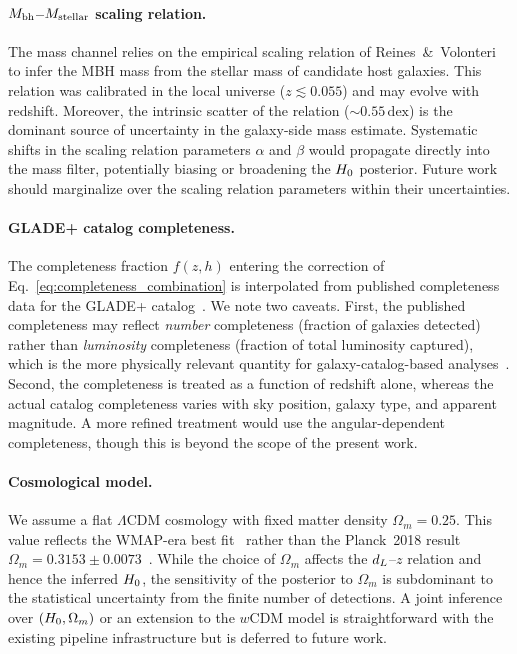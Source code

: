 \paragraph{$M_\mathrm{bh}$--$M_\mathrm{stellar}$ scaling relation.}
The mass channel relies on the empirical scaling relation of
Reines~\&~Volonteri~\cite{Reines:2015moa} to infer the MBH mass from
the stellar mass of candidate host galaxies.  This relation was
calibrated in the local universe ($z \lesssim 0.055$) and may evolve
with redshift.  Moreover, the intrinsic scatter of the relation
($\sim 0.55\,\mathrm{dex}$) is the dominant source of uncertainty in
the galaxy-side mass estimate.  Systematic shifts in the scaling
relation parameters $\alpha$ and $\beta$ would propagate directly into
the mass filter, potentially biasing or broadening the $H_0$ posterior.
Future work should marginalize over the scaling relation parameters
within their uncertainties.

\paragraph{GLADE+ catalog completeness.}
The completeness fraction $f(z, h)$ entering the correction of
Eq.~\eqref{eq:completeness_combination} is interpolated from published
completeness data for the GLADE+ catalog~\cite{Dalya:2021ewn}.  We note
two caveats.  First, the published completeness may reflect
\emph{number} completeness (fraction of galaxies detected) rather than
\emph{luminosity} completeness (fraction of total luminosity captured),
which is the more physically relevant quantity for galaxy-catalog-based
analyses~\cite{Gray:2019ksv}.  Second, the completeness is treated as a
function of redshift alone, whereas the actual catalog completeness
varies with sky position, galaxy type, and apparent magnitude.  A more
refined treatment would use the angular-dependent completeness, though
this is beyond the scope of the present work.

\paragraph{Cosmological model.}
We assume a flat $\Lambda$CDM cosmology with fixed matter density
$\Omega_m = 0.25$.  This value reflects the WMAP-era best
fit~\cite{Hinshaw:2012aka} rather than the Planck~2018 result
$\Omega_m = 0.3153 \pm 0.0073$~\cite{Planck:2018vyg}.  While the
choice of $\Omega_m$ affects the $d_L$--$z$ relation and hence the
inferred $H_0$, the sensitivity of the posterior to $\Omega_m$ is
subdominant to the statistical uncertainty from the finite number of
detections.  A joint inference over $(H_0, \Omega_m)$ or an extension
to the $w$CDM model is straightforward with the existing pipeline
infrastructure but is deferred to future work.


